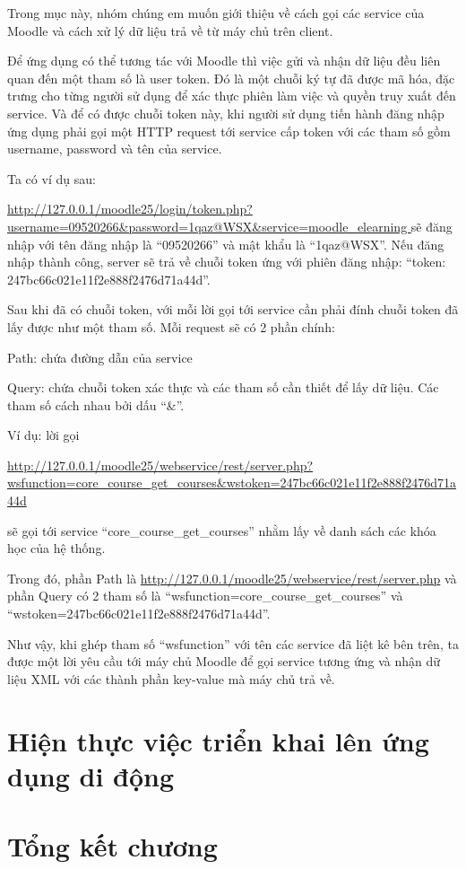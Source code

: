 Trong mục này, nhóm chúng em muốn giới thiệu về cách gọi các service của Moodle và cách xử lý dữ liệu trả về từ máy chủ trên client.

Để ứng dụng có thể tương tác với Moodle thì việc gửi và nhận dữ liệu đều liên quan đến một tham số là user token. Đó là một chuỗi ký tự đã được mã hóa, đặc trưng cho từng người sử dụng để xác thực phiên làm việc và quyền truy xuất đến service. Và để có được chuỗi token này, khi người sử dụng tiến hành đăng nhập ứng dụng phải gọi một HTTP request tới service cấp token với các tham số gồm username, password và tên của service.

Ta có ví dụ sau:

\url{http://127.0.0.1/moodle25/login/token.php?username=09520266\&password=1qaz@WSX&service=moodle_elearning } sẽ đăng nhập với tên đăng nhập là “09520266” và mật khẩu là “1qaz@WSX”. Nếu đăng nhập thành công, server sẽ trả về chuỗi token ứng với phiên đăng nhập: “token: 247bc66c021e11f2e888f2476d71a44d”.

Sau khi đã có chuỗi token, với mỗi lời gọi tới service cần phải đính chuỗi token đã lấy được như một tham số. Mỗi request sẽ có 2 phần chính:

\quad Path: chứa đường dẫn của service

\quad Query: chứa chuỗi token xác thực và các tham số cần thiết để lấy dữ liệu. Các tham số cách nhau bởi dấu “\&”.

Ví dụ: lời gọi

\url{http://127.0.0.1/moodle25/webservice/rest/server.php?wsfunction=core_course_get_courses&wstoken=247bc66c021e11f2e888f2476d71a44d}
  
sẽ gọi tới service “core\_course\_get\_courses” nhằm lấy về danh sách các khóa học của hệ thống. 

Trong đó, phần Path là \url{http://127.0.0.1/moodle25/webservice/rest/server.php} và phần Query có 2 tham số là “wsfunction=core\_course\_get\_courses” và “wstoken=247bc66c021e11f2e888f2476d71a44d”.

Như vậy, khi ghép tham số “wsfunction” với tên các service đã liệt kê bên trên, ta được một lời yêu cầu tới máy chủ Moodle để gọi service tương ứng và nhận dữ liệu XML với các thành phần key-value mà máy chủ trả về.


\section{Hiện thực việc triển khai lên ứng dụng di động}

\section{Tổng kết chương}

